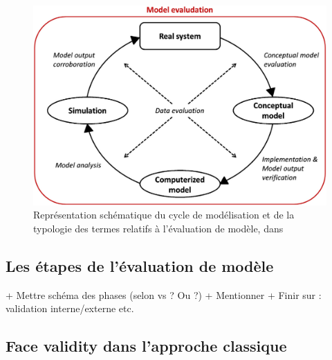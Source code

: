\begin{figure}[H]
	\includegraphics[width=\linewidth]{img/Schema_Augusiak_evaludation.png}
	\caption{Représentation schématique du cycle de modélisation et de la typologie des termes relatifs à l'évaluation de modèle, dans \cite[Fig. 1, p. 121]{augusiak_merging_2014}}
	\label{fig:schema_evaludationl}
\end{figure}

\subsection{Les étapes de l'évaluation de modèle}


\clearpage
+ Mettre schéma des phases (selon \autocite{hermann_validation_1967} vs  \autocite{naylor_verification_1967} ? Ou \autocite{klugl_validation_2008}?) + Mentionner \cite{sargent2009verification} + Finir sur \cite{amblard_assessment_2007} : validation interne/externe etc.


\subsection{\og Face validity\fg{} dans l'approche classique}



